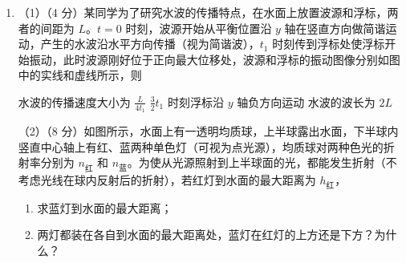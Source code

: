 \documentclass[\gkver]{gaokaozhenti}
\begin{document}
\begin{enumerate}

\item
（1）（4 分）某同学为了研究水波的传播特点，在水面上放置波源和浮标，两者的间距为 $L$。$t = 0$ 时刻，波源开始从平衡位置沿 $y$ 轴在竖直方向做简谐运动，产生的水波沿水平方向传播（视为简谐波），$t_{1}$ 时刻传到浮标处使浮标开始振动，此时波源刚好位于正向最大位移处，波源和浮标的振动图像分别如图中的实线和虚线所示，则


{水波的传播速度大小为 $\frac{L}{4t_{1}}$}
{$\frac{3}{2}t_{1}$ 时刻浮标沿 $y$ 轴负方向运动}
{水波的波长为 $2L$}

（2）（8 分）如图所示，水面上有一透明均质球，上半球露出水面，下半球内竖直中心轴上有红、蓝两种单色灯（可视为点光源），均质球对两种色光的折射率分别为 $n_{\text{红}}$ 和 $n_{\text{蓝}}$。为使从光源照射到上半球面的光，都能发生折射（不考虑光线在球内反射后的折射），若红灯到水面的最大距离为 $h_{\text{红}}$，
\begin{enumerate}
	\item
	求蓝灯到水面的最大距离；
	\item
	两灯都装在各自到水面的最大距离处，蓝灯在红灯的上方还是下方？为什么？
\end{enumerate}


\end{enumerate}
\end{document}
